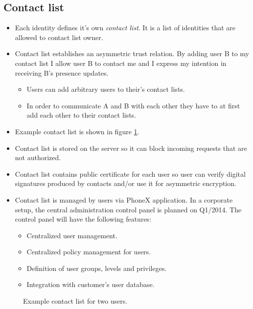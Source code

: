 \documentclass[a4paper,10pt]{article}
\begin{document}
\subsection{Contact list}
\begin{itemize}
 \item Each identity defines it's own \emph{contact list}. It is a list of identities that are allowed to contact list owner. 
 \item Contact list establishes an asymmetric trust relation. By adding user B to my contact list I allow user B to contact me
and I express my intention in receiving B's presence updates.
\begin{itemize}
 \item Users can add arbitrary users to their's contact lists.
 \item In order to communicate A and B with each other they have to at first add each other to their contact lists.
\end{itemize}
 \item Example contact list is shown in figure \ref{fig:contactlist}.
 \item Contact list is stored on the server so it can block incoming requests that are not authorized.  
 \item Contact list contains public certificate for each user so user can verify digital signatures produced by contacts and/or use it for asymmetric encryption.
 \item Contact list is managed by users via PhoneX application. In a corporate setup, the central administration control 
panel is planned on Q1/2014. The control panel will have the following features:
\begin{itemize}
 \item Centralized user management.
 \item Centralized policy management for users.
 \item Definition of user groups, levels and privileges.
 \item Integration with customer's user database.
\end{itemize}
\end{itemize}


\begin{center}
\begin{figure}[h!]
\centering
{}
\caption{Example contact list for two users.}
\label{fig:contactlist}
\end{figure}
\end{center}
\end{document}
